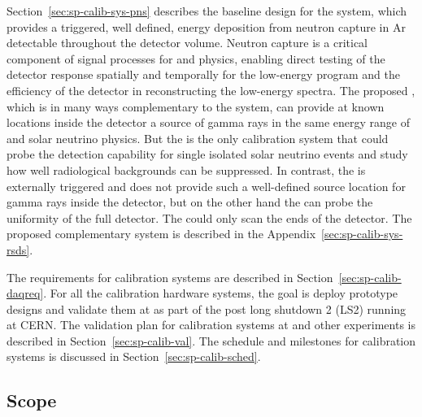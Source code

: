 Section~\ref{sec:sp-calib-sys-pns} describes the baseline design for the  system, which provides a triggered, well defined, energy deposition from neutron capture in Ar detectable throughout the detector volume. Neutron capture is a critical component of signal processes for  and  physics, enabling direct testing of the detector response spatially and temporally for the low-energy program and the efficiency of the detector in reconstructing the low-energy spectra. The proposed , 
which is in many ways complementary to the 
system, can provide at known locations inside the detector a source of gamma rays in the same energy range of  and solar neutrino physics. But the  is the only calibration system that could probe the detection capability for single isolated solar neutrino events and study how well radiological backgrounds can be suppressed. In contrast, the  is externally triggered and does not provide such a well-defined source location for gamma rays inside the detector, but on the other hand the  can probe the uniformity of the full detector. The  could only scan the ends of the detector. The proposed complementary  system is described in the Appendix~\ref{sec:sp-calib-sys-rsds}. 

The  requirements for calibration systems are described in Section~\ref{sec:sp-calib-daqreq}. For all the calibration hardware systems, the goal is deploy prototype designs and validate them at  as part of the post long shutdown 2 (LS2) running  at CERN. The validation plan for calibration systems at  and other experiments is described in Section~\ref{sec:sp-calib-val}. 
The schedule and milestones for calibration systems is discussed in Section~\ref{sec:sp-calib-sched}.


\subsection{Scope}
\label{sec:sp-calib-ov-scope}

